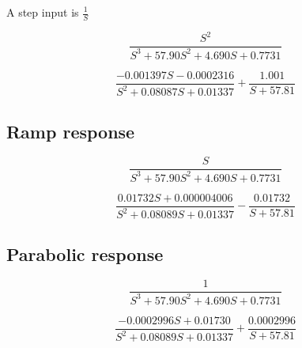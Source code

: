 A step input is $\frac{1}{S}$

\begin{equation}
\frac{S^2}{S^3 +57.90 S^2 + 4.690 S +0.7731}
\end{equation}

\begin{equation}
\frac{-0.001397 S - 0.0002316}{S^2 + 0.08087 S + 0.01337} + \frac{1.001}{S + 57.81}
\end{equation}

\subsection{Ramp response}

\begin{equation}
\frac{S}{S^3 +57.90 S^2 + 4.690 S +0.7731}
\end{equation}

\begin{equation}
\frac{0.01732 S + 0.000004006}{S^2 +0.08089 S +0.01337} - \frac{0.01732}{S + 57.81}
\end{equation}

\subsection{Parabolic response}

\begin{equation}
\frac{1}{S^3 +57.90 S^2 + 4.690 S +0.7731}
\end{equation}

\begin{equation}
\frac{-0.0002996 S + 0.01730}{S^2 + 0.08089 S + 0.01337}+\frac{0.0002996}{S+ 57.81}
\end{equation}


